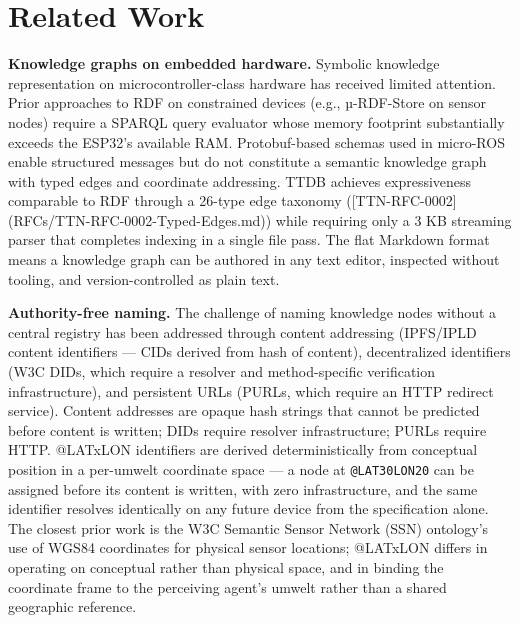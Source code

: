 \documentclass[11pt]{article}
\begin{document}

\section{Related Work}


\textbf{Knowledge graphs on embedded hardware.} Symbolic knowledge representation on microcontroller-class hardware has received limited attention. Prior approaches to RDF on constrained devices (e.g., µ-RDF-Store on sensor nodes) require a SPARQL query evaluator whose memory footprint substantially exceeds the ESP32's available RAM. Protobuf-based schemas used in micro-ROS enable structured messages but do not constitute a semantic knowledge graph with typed edges and coordinate addressing. TTDB achieves expressiveness comparable to RDF through a 26-type edge taxonomy ([TTN-RFC-0002](RFCs/TTN-RFC-0002-Typed-Edges.md)) while requiring only a 3 KB streaming parser that completes indexing in a single file pass. The flat Markdown format means a knowledge graph can be authored in any text editor, inspected without tooling, and version-controlled as plain text.

\textbf{Authority-free naming.} The challenge of naming knowledge nodes without a central registry has been addressed through content addressing (IPFS/IPLD content identifiers --- CIDs derived from hash of content), decentralized identifiers (W3C DIDs, which require a resolver and method-specific verification infrastructure), and persistent URLs (PURLs, which require an HTTP redirect service). Content addresses are opaque hash strings that cannot be predicted before content is written; DIDs require resolver infrastructure; PURLs require HTTP. @LATxLON identifiers are derived deterministically from conceptual position in a per-umwelt coordinate space --- a node at \texttt{@LAT30LON20} can be assigned before its content is written, with zero infrastructure, and the same identifier resolves identically on any future device from the specification alone. The closest prior work is the W3C Semantic Sensor Network (SSN) ontology's use of WGS84 coordinates for physical sensor locations; @LATxLON differs in operating on conceptual rather than physical space, and in binding the coordinate frame to the perceiving agent's umwelt rather than a shared geographic reference.
\end{document}
